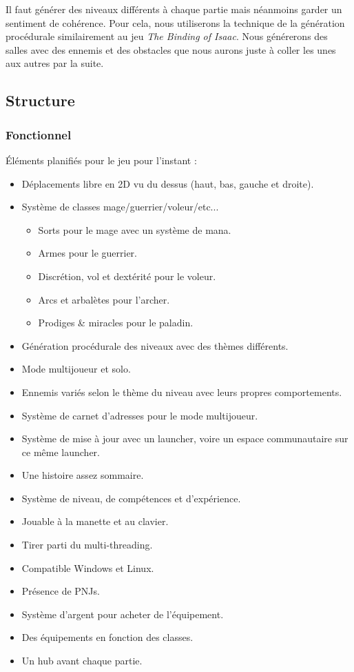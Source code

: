 \documentclass{article}
\begin{document}
Il faut générer des niveaux différents à chaque partie mais néanmoins garder un sentiment de cohérence. Pour cela, nous utiliserons la technique de la génération procédurale similairement au jeu \textit{The Binding of Isaac}. Nous générerons des salles avec des ennemis et des obstacles que nous aurons juste à coller les unes aux autres par la suite.

\subsection{Structure}

\subsubsection{Fonctionnel}

Éléments planifiés pour le jeu pour l'instant :
\begin{itemize}
    \item Déplacements libre en 2D vu du dessus (haut, bas, gauche et droite).
    \item Système de classes mage/guerrier/voleur/etc...
    \begin{itemize}
        \item Sorts pour le mage avec un système de mana.
        \item Armes pour le guerrier.
        \item Discrétion, vol et dextérité pour le voleur.
        \item Arcs et arbalètes pour l'archer.
        \item Prodiges \& miracles pour le paladin.
    \end{itemize}
    \item Génération procédurale des niveaux avec des thèmes différents.
    \item Mode multijoueur et solo.
    \item Ennemis variés selon le thème du niveau avec leurs propres comportements.
    \item Système de carnet d'adresses pour le mode multijoueur.
    \item Système de mise à jour avec un launcher, voire un espace communautaire sur ce même launcher.
    \item Une histoire assez sommaire.
    \item Système de niveau, de compétences et d'expérience.
    \item Jouable à la manette et au clavier.
    \item Tirer parti du multi-threading.
    \item Compatible Windows et Linux.
    \item Présence de PNJs.
    \item Système d'argent pour acheter de l'équipement.
    \item Des équipements en fonction des classes.
    \item Un hub avant chaque partie.
\end{itemize}
\end{document}
